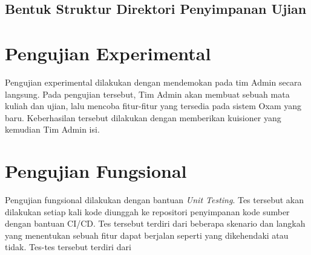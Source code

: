     \subsection{Bentuk Struktur Direktori Penyimpanan Ujian}


\section{Pengujian Experimental}
Pengujian experimental dilakukan dengan mendemokan pada tim Admin secara langsung. Pada pengujian
tersebut, Tim Admin akan membuat sebuah mata kuliah dan ujian, lalu mencoba fitur-fitur yang tersedia
pada sistem Oxam yang baru. Keberhasilan tersebut dilakukan dengan memberikan kuisioner yang kemudian
Tim Admin isi.


\section{Pengujian Fungsional}
Pengujian fungsional dilakukan dengan bantuan \textit{Unit Testing}. Tes tersebut akan dilakukan
setiap kali kode diunggah ke repositori penyimpanan kode sumber dengan bantuan CI/CD. Tes tersebut
terdiri dari beberapa skenario dan langkah yang menentukan sebuah fitur dapat berjalan seperti
yang dikehendaki atau tidak. Tes-tes tersebut terdiri dari
